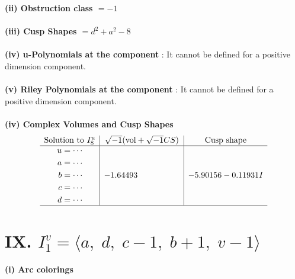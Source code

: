 \documentclass[1p]{elsarticle_modified}
\theoremstyle{definition}
\newcommand{\I}{\sqrt{-1}}
\begin{document}
\flushleft \textbf{(ii) Obstruction class $= -1$}\\~\\
\flushleft \textbf{(iii) Cusp Shapes $= d^2+a^2-8$}\\~\\
\flushleft \textbf{(iv) u-Polynomials at the component} : It cannot be defined for a positive dimension component.\\~\\
\flushleft \textbf{(v) Riley Polynomials at the component} : It cannot be defined for a positive dimension component.\\~\\
\newpage\flushleft \textbf{(iv) Complex Volumes and Cusp Shapes}
$$\begin{array}{c|c|c} 
\text{Solution to }I^u_{8}& \I (\text{vol} + \sqrt{-1}CS) & \text{Cusp shape}\\
 \hline 
\begin{aligned}
u &= \cdots \\
a &= \cdots \\
b &= \cdots \\
c &= \cdots \\
d &= \cdots\end{aligned}
 & -1.64493\phantom{ +0.000000I} & -5.90156 - 0.11931 I\\
 \hline 
 \end{array}
$$\newpage\renewcommand{\arraystretch}{1}
\centering \section*{IX. $I^v_{1}= \langle a,\;d,\;c-1,\;b+1,\;v-1 \rangle$}
\flushleft \textbf{(i) Arc colorings}\\
\end{document}

